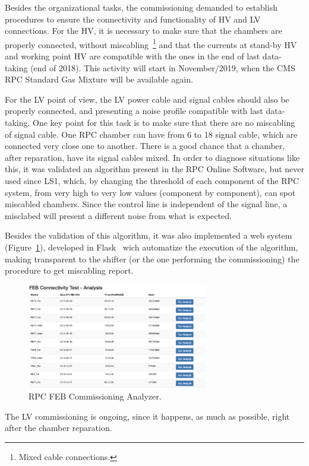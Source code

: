 Besides the organizational tasks, the commissioning demanded to establish procedures to ensure the connectivity and functionality of HV and LV connections. For the HV, it is necessary to make sure that the chambers are properly connected, without miscabling~\footnote{Mixed cable connections.} and that the currents at stand-by HV  and working point HV are compatible with the ones in the end of last data-taking (end of 2018). This activity will start in November/2019, when the CMS RPC Standard Gas Mixture will be available again.
 
For the LV point of view, the LV power cable and signal cables should also be properly connected, and presenting a noise profile compatible with last data-taking. One key point for this task is to make sure that there are no miscabling of signal cable. One RPC chamber can have from 6 to 18 signal cable, which are connected very close one to another. There is a good chance that a chamber, after reparation, have its signal cables mixed. In order to diagnose situations like this, it was validated an algorithm present in the RPC Online Software, but never used since LS1, which, by changing the threshold of each component of the RPC system, from very high to very low values (component by component), can spot miscabled chambers. Since the control line is independent of the signal line, a misclabed will present a different noise from what is expected.

Besides the validation of this algorithm, it was also implemented a web system (Figure~\ref{comm}), developed in Flask~\cite{flask} wich automatize the execution of the algorithm, making transparent to the shifter (or the one performing the commissioning) the procedure to get miscabling report.

\begin{figure}[h]
\begin{center}
\includegraphics[width=0.7\textwidth,keepaspectratio]{figures_and_tables/rpc/comm.png}
\end{center}
\caption{RPC FEB Commissioning Analyzer.}\label{comm}
\end{figure}

The LV commissioning is ongoing, since it happens, as much as possible, right after the chamber reparation.

\clearpage